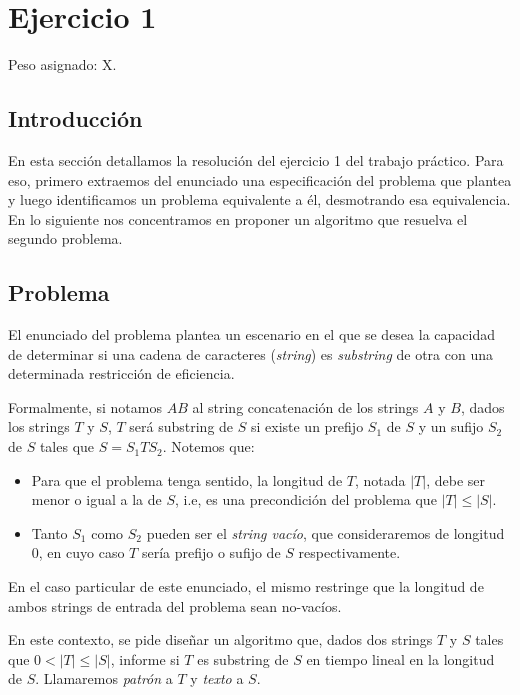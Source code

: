 \section{Ejercicio 1}

Peso asignado: X.

\subsection{Introducción}

En esta sección detallamos la resolución del ejercicio 1 del trabajo práctico. Para eso, primero extraemos del enunciado una especificación del problema que plantea y luego identificamos un problema equivalente a él, desmotrando esa equivalencia. En lo siguiente nos concentramos en proponer un algoritmo que resuelva el segundo problema.

\subsection{Problema}

El enunciado del problema plantea un escenario en el que se desea la capacidad de determinar si una cadena de caracteres (\textit{string}) es \textit{substring} de otra con una determinada restricción de eficiencia.

Formalmente, si notamos $AB$ al string concatenación de los strings $A$ y $B$, dados los strings $T$ y $S$, $T$ será substring de $S$ si existe un prefijo $S_1$ de $S$ y un sufijo $S_2$ de $S$ tales que $S = S_1 T S_2$. Notemos que:
\begin{itemize}
\item Para que el problema tenga sentido, la longitud de $T$, notada $|T|$, debe ser menor o igual a la de $S$, i.e, es una precondición del problema que $|T| \leq |S|$.
\item Tanto $S_1$ como $S_2$ pueden ser el \textit{string vacío}, que consideraremos de longitud $0$, en cuyo caso $T$ sería prefijo o sufijo de $S$ respectivamente.
\end{itemize}

En el caso particular de este enunciado, el mismo restringe que la longitud de ambos strings de entrada del problema sean no-vacíos.

En este contexto, se pide diseñar un algoritmo que, dados dos strings $T$ y $S$ tales que $0 < |T| \leq |S|$, informe si $T$ es substring de $S$ en tiempo lineal en la longitud de $S$. Llamaremos \textit{patrón} a $T$ y \textit{texto} a $S$.

